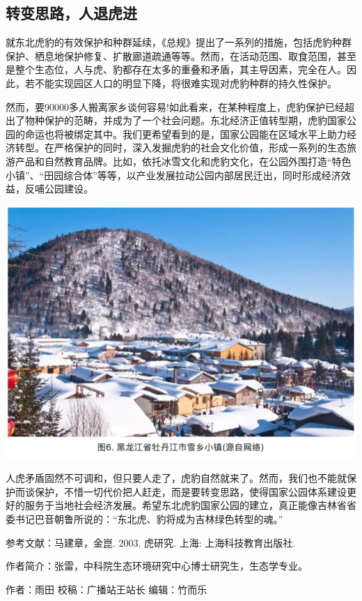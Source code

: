 \documentclass[]{book}
\begin{document}
\subsection{转变思路，人退虎进}

就东北虎豹的有效保护和种群延续，《总规》提出了一系列的措施，包括虎豹种群保护、栖息地保护修复、扩散廊道疏通等等。然而，在活动范围、取食范围，甚至是整个生态位，人与虎、豹都存在太多的重叠和矛盾，其主导因素，完全在人。因此，若不能实现园区人口的明显下降，将很难实现对虎豹种群的持久性保护。

然而，要90000多人搬离家乡谈何容易!如此看来，在某种程度上，虎豹保护已经超出了物种保护的范畴，并成为了一个社会问题。东北经济正值转型期，虎豹国家公园的命运也将被绑定其中。我们更希望看到的是，国家公园能在区域水平上助力经济转型。在严格保护的同时，深入发掘虎豹的社会文化价值，形成一系列的生态旅游产品和自然教育品牌。比如，依托冰雪文化和虎豹文化，在公园外围打造``特色小镇''、``田园综合体''等等，以产业发展拉动公园内部居民迁出，同时形成经济效益，反哺公园建设。

\includegraphics[width=8.33in]{images/tiger6}

人虎矛盾固然不可调和，但只要人走了，虎豹自然就来了。然而，我们也不能就保护而谈保护，不惜一切代价把人赶走，而是要转变思路，使得国家公园体系建设更好的服务于当地社会经济发展。希望东北虎豹国家公园的建立，真正能像吉林省省委书记巴音朝鲁所说的：``东北虎、豹将成为吉林绿色转型的魂。''

参考文献：马建章，金崑. 2003. 虎研究. 上海: 上海科技教育出版社.

作者简介：张雷，中科院生态环境研究中心博士研究生，生态学专业。

作者：雨田 校稿：广播站王站长 编辑：竹而乐
\end{document}

